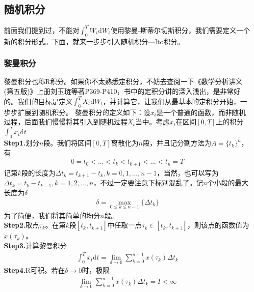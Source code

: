     \subsection{随机积分}
        \label{subsec:随机积分}
        \par
        前面我们提到过，不能对$\int_0^T W_t \mathrm{d}W_t$使用黎曼-斯蒂尔切斯积分，我们需要定义一个新的积分形式。下面，就来一步步引入随机积分—Ito积分。
        \subsubsection{黎曼积分}
            \label{subsubsec:黎曼积分}
            \par
            黎曼积分也称R积分。如果你不太熟悉定积分，不妨去查阅一下《数学分析讲义(第五版)》上册刘玉琏等著P369-P410，书中的定积分讲的深入浅出，是非常好的。我们的目标是定义$\int_0^T X_t \mathrm{d}W_t$，并计算它，让我们从最基本的定积分开始，一步步扩展到随机积分。
            黎曼积分的定义如下：设$x_t$是一个普通的函数，而非随机过程，后面我们慢慢将其引入到随机过程$X_t$当中。考虑$x_t$在区间$[0,T]$上的积分$\int_0^T x_t \mathrm{d}t$\\
            \textbf{Step1.}划分$n$段。我们将区间$[0,T]$离散化为$n$段，并且记分割方法为$A = \{t_k\}^n$，有
            \begin{align*}
                0 = t_0 <\dots <t_k<t_{k+1}<\dots<t_n = T
            \end{align*}
            记第$k$段的长度为$\Delta t_k = t_{k+1}-t_k,k = 0,1,\dots,n - 1$，当然，也可以写为$\Delta t_k = t_{k}-t_{k-1},k = 1,2,\dots,n$，不过一定要注意下标别混乱了。记$n$个小段的最大长度为$\delta$
            \begin{align*}
                \delta = \max_{0 \leqslant k \leqslant n-1}\{\Delta t_k\}
            \end{align*}
            为了简便，我们将其简单的均分$n$段。\\
            \textbf{Step2.}取点$\tau_k$。在第$k$段$[t_{k},t_{k+1}]$中任取一点$\tau_k\in [t_{k},t_{k+1}]$，则该点的函数值为$x(\tau_k)$。\\
            \textbf{Step3.}计算黎曼积分
            \begin{align*}
                \int_0^T x_t\mathrm{d}t = \lim_{\delta \rightarrow 0} \sum_{k = 0}^{n-1} x(\tau_k)\Delta t_k
            \end{align*}
            \textbf{Step4.}R可积。若在$\delta\rightarrow 0$时，极限
            \begin{align*}
                \lim_{\delta \rightarrow 0} \sum_{k = 0}^{n-1} x(\tau_k)\Delta t_k = I<\infty
            \end{align*}
